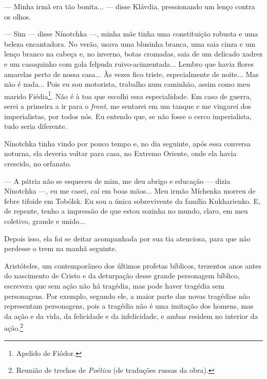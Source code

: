 --- Minha irmã era tão bonita... --- disse Klávdia, pressionando um
lenço contra os olhos.

--- Sim --- disse Nínotchka ---, minha mãe tinha uma constituição
robusta e uma beleza encantadora. No verão, usava uma blusinha branca,
uma saia cinza e um lenço branco na cabeça e, no inverno, botas
cromadas, saia de um delicado xadrez e um casaquinho com gola felpuda
ruivo-acinzentada... Lembro que havia flores amarelas perto de nossa
casa... Às vezes fico triste, especialmente de noite... Mas não é
nada... Pois eu sou motorista, trabalho num caminhão, assim como meu
marido Fiédia\footnote{Apelido de Fiódor.}. Não é à toa que escolhi essa
especialidade. Em caso de guerra, serei a primeira a ir para o
\emph{front}, me sentarei em um tanque e me vingarei dos imperialistas,
por todos nós. Eu entendo que, se não fosse o cerco imperialista, tudo
seria diferente.

Nínotchka tinha vindo por pouco tempo e, no dia seguinte, após essa
conversa noturna, ela deveria voltar para casa, no Extremo Oriente, onde
ela havia crescido, no orfanato.

--- A pátria não se esqueceu de mim, me deu abrigo e educação --- dizia
Nínotchka ---, eu me casei, caí em boas mãos... Meu irmão Míchenka
morreu de febre tifoide em Tobólsk. Eu sou a única sobrevivente da
família Kukharienko. E, de repente, tenho a impressão de que estou
sozinha no mundo, claro, em meu coletivo, grande e unido...

Depois isso, ela foi se deitar acompanhada por sua tia atenciosa, para
que não perdesse o trem na manhã seguinte.

Aristóteles, um contemporâneo dos últimos profetas bíblicos, trezentos
anos antes do nascimento de Cristo e da deturpação desse grande
personagem bíblico, escrevera que sem ação não há tragédia, mas pode
haver tragédia sem personagens. Por exemplo, segundo ele, a maior parte
das novas tragédias não representam personagens, pois a tragédia não é
uma imitação dos homens, mas da ação e da vida, da felicidade e da
infelicidade, e ambas residem no interior da ação.\footnote{Reunião de
  trechos de \emph{Poética} (de traduções russas da obra).}

